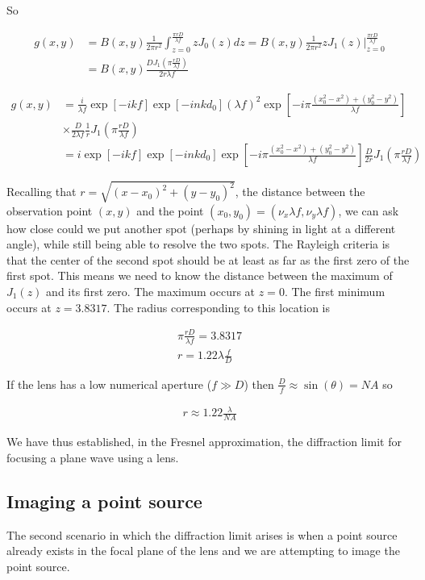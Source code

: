 \documentclass[12pt]{article}
\begin{document}
So

\begin{align}
g(x,y) &= B(x,y) \frac{1}{2\pi r^2} \int_{z=0}^{\frac{\pi r D}{\lambda f}} z J_0(z) dz = B(x,y) \frac{1}{2\pi r^2} z J_1(z)\bigg|_{z=0}^{\frac{\pi r D}{\lambda f}}\\
&= B(x,y) \frac{D J_1\left(\pi \frac{r D}{\lambda f}\right)}{2 r \lambda f}
\end{align}

\begin{align}
g(x,y) &= \frac{i}{\lambda f} \exp[-i k f] \exp[-inkd_0] (\lambda f)^2 \exp\left[-i\pi\frac{(x_0^2-x^2)+(y_0^2-y^2)}{\lambda f}\right]\\
&\times \frac{D}{2 \lambda f} \frac{1}{r} J_1\left(\pi \frac{rD}{\lambda f}\right)\\
&= i\exp[-ikf]\exp[-inkd_0] \exp\left[-i\pi\frac{(x_0^2-x^2)+(y_0^2-y^2)}{\lambda f}\right] \frac{D}{2r}J_1\left(\pi \frac{rD}{\lambda f}\right)
\end{align}

Recalling that $r = \sqrt{(x-x_0)^2+(y-y_0)^2}$, the distance between the observation point $(x,y)$ and the point $(x_0,y_0) = (\nu_x \lambda f, \nu_y \lambda f)$, we can ask how close could we  put another spot (perhaps by shining in light at a different angle), while still being able to resolve the two spots. The Rayleigh criteria is that the center of the second spot should be at least as far as the first zero of the first spot. This means we need to know the distance between the maximum of $J_1(z)$ and its first zero. The maximum occurs at $z=0$. The first minimum occurs at $z=3.8317$. The radius corresponding to this location is

\begin{align}
\pi \frac{r D}{\lambda f} = 3.8317\\
r = 1.22 \lambda \frac{f}{D}
\end{align}

If the lens has a low numerical aperture ($f \gg D$) then $\frac{D}{f} \approx \sin(\theta) = NA$ so

\begin{align}
r \approx 1.22 \frac{\lambda}{NA}
\end{align}

We have thus established, in the Fresnel approximation, the diffraction limit for focusing a plane wave using a lens.

\subsection{Imaging a point source}

The second scenario in which the diffraction limit arises is when a point source already exists in the focal plane of the lens and we are attempting to image the point source. 
\end{document}
